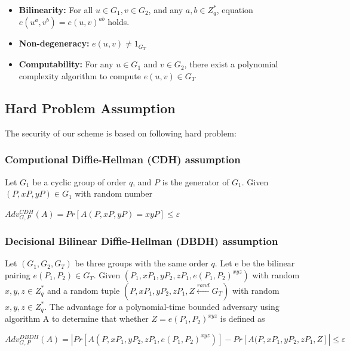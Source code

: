 \documentclass[journal]{IEEEtran}
\begin{document}
\begin{itemize}
    \item \textbf{Bilinearity:}
    For all $u \in G_1, v \in G_2$, and any $a,b \in Z_q^*$, equation $e(u^a,v^b) = e(u,v)^{ab}$ holds.
    \item \textbf{Non-degeneracy:}
    $e(u,v) \neq 1_{G_T}$
    \item \textbf{Computability:}
    For any $u \in G_1$ and $v \in G_2$, there exist a polynomial complexity algorithm to  compute $e(u,v) \in G_T$
\end{itemize}
     
    \subsection{Hard Problem Assumption} 
    The security of our scheme is based on following hard problem:
    
    \subsubsection{Computional Diffie-Hellman (CDH) assumption \cite{iom2014}}
    Let $G_1$ be a cyclic group of order $q$, and $P$ is the generator of $G_1$. Given $(P,xP,yP) \in G_1$ with random number %

\begin{center}
    $Adv_{G,P}^{CDH}(A) = Pr[A(P,xP,yP) = xyP] \leq \varepsilon$
\end{center}

    \subsubsection{Decisional Bilinear Diffie-Hellman (DBDH) assumption \cite{ndi1976}}
    Let $(G_1, G_2, G_T)$ be three groups with the same order $q$. Let e be the bilinear pairing $e(P_1, P_2) \in G_T$. Given $(P_1,xP_1,yP_2,zP_1,e(P_1,P_2)^{xyz})$ with random $x,y,z \in Z_q^*$ and a random tuple $(P,xP_1,yP_2,zP_1,Z\xleftarrow[]{rand}G_T)$ with random $x,y,z \in Z_q^*$. The advantage for a polynomial-time bounded adversary using algorithm A to determine that whether $Z=e(P_1,P_2)^{xyz}$ is defined as

\begin{center}
    $Adv_{G,P}^{DBDH}(A) = |Pr[A(P,xP_1,yP_2,zP_1,e(P_1,P_2)^{xyz})]-Pr[A(P,xP_1,yP_2,zP_1,Z]| \leq \varepsilon$
\end{center}
\end{document}
